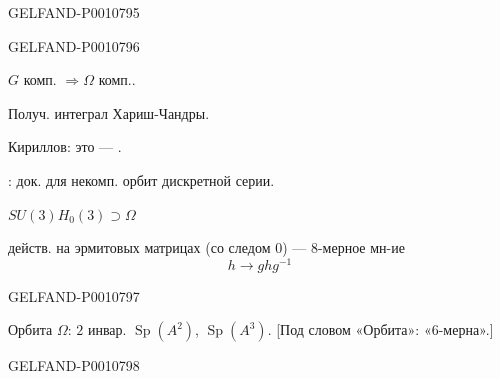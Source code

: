 \begin{GelfandAdjacentEvidence}{GELFAND-P001079}{5}

\end{GelfandAdjacentEvidence}
\begin{GelfandAdjacentEvidence}{GELFAND-P001079}{6}


$G$ комп. $\Rightarrow\Omega$ комп..

Получ. интеграл Хариш-Чандры.

Кириллов: это — .

: док. для некомп. орбит дискретной серии.


$SU(3)$\qquad $H_0(3)\supset\Omega$

действ. на эрмитовых матрицах (со следом $0$) — $8$-мерное мн-ие
\[
h\longrightarrow ghg^{-1}
\]
\end{GelfandAdjacentEvidence}
\begin{GelfandAdjacentEvidence}{GELFAND-P001079}{7}


Орбита $\Omega$: $2$ инвар. $\operatorname{Sp}(A^2)$, $\operatorname{Sp}(A^3)$.
[Под словом «Орбита»: «6-мерна».]
\end{GelfandAdjacentEvidence}
\begin{GelfandAdjacentEvidence}{GELFAND-P001079}{8}

\end{GelfandAdjacentEvidence}
